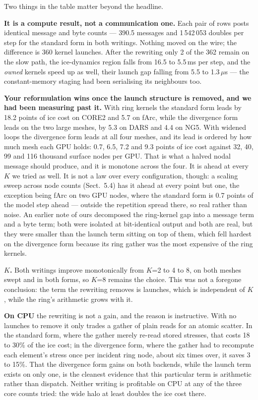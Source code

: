 \documentclass[11pt,a4paper]{article}
\begin{document}
Two things in the table matter beyond the headline.

\textbf{It is a compute result, not a communication one.} Each pair of rows posts identical message
and byte counts --- 390.5 messages and 1\,542\,053 doubles per step for the standard form in both
writings. Nothing moved on the wire; the difference is 360 kernel launches. After the rewriting
only 2 of the 362 remain on the slow path, the ice-dynamics region falls from 16.5 to 5.5\,ms per
step, and the \emph{owned} kernels speed up as well, their launch gap falling from 5.5 to
1.3\,$\mu$s --- the constant-memory staging had been serialising its neighbours too.

\textbf{Your reformulation wins once the launch structure is removed, and we had been measuring
past it.} With ring kernels the standard form leads by 18.2 points of ice cost on CORE2 and 5.7 on
fArc, while the divergence form leads on the two large meshes, by 5.3 on DARS and 4.4 on NG5. With
widened loops the divergence form leads
at all four meshes, and its lead is ordered by how much mesh each GPU holds: 0.7, 6.5, 7.2 and 9.3
points of ice cost against 32, 40, 99 and 116 thousand surface nodes per GPU. That is what a halved
nodal message should produce, and it is monotone across the four. It is ahead at every $K$ we tried
as well. It is not a law over every configuration, though: a scaling sweep across node counts
(Sect.~5.4) has it ahead at every point but one, the exception being fArc on two GPU nodes, where
the standard form is 0.7 points of the model step ahead --- outside the repetition spread there, so
real rather than noise. An earlier note of ours decomposed the ring-kernel
gap into a message term and a byte term; both were isolated at bit-identical output and both are
real, but they were smaller than the launch term sitting on top of them, which fell hardest on the
divergence form because its ring gather was the most expensive of the ring kernels.

\textbf{$K$.} Both writings improve monotonically from $K$=2 to 4 to 8, on both meshes swept and in
both forms, so $K$=8 remains the choice. This was not a foregone conclusion: the term the rewriting
removes is launches, which is independent of $K$, while the ring's arithmetic grows with it.

\textbf{On CPU} the rewriting is not a gain, and the reason is instructive. With no launches to
remove it only trades a gather of plain reads for an atomic scatter. In the standard form, where
the gather merely re-read stored stresses, that costs 18 to 30\% of the ice cost; in the divergence
form, where the gather had to recompute each element's stress once per incident ring node, about
six times over, it saves 3 to 15\%. That the divergence form gains on both backends, while the
launch term exists on only one, is the cleanest evidence that this particular term is arithmetic
rather than dispatch. Neither writing is profitable on CPU at any of the three core counts tried:
the wide halo at least doubles the ice cost there.
\end{document}
